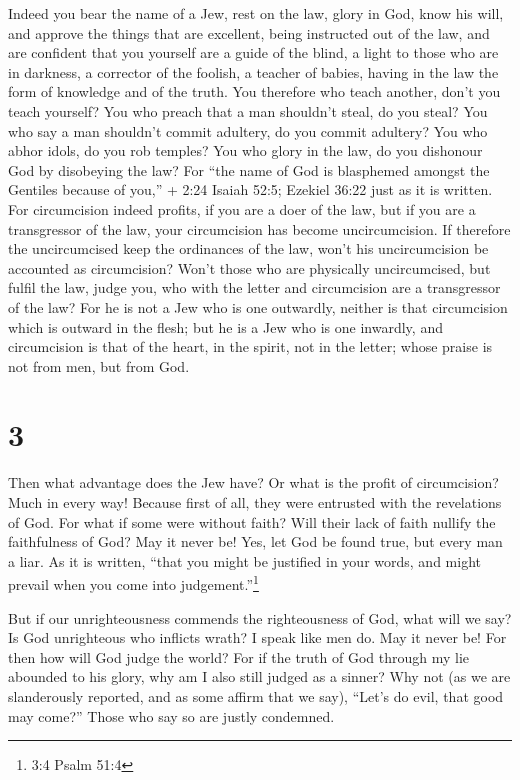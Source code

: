 Indeed you bear the name of a Jew, rest on the law, glory
in God,  know his will, and approve the things that are
excellent, being instructed out of the law,  and are
confident that you yourself are a guide of the blind, a light to those
who are in darkness,  a corrector of the foolish, a teacher
of babies, having in the law the form of knowledge and of the truth.
 You therefore who teach another, don't you teach yourself?
You who preach that a man shouldn't steal, do you steal? 
You who say a man shouldn't commit adultery, do you commit adultery? You
who abhor idols, do you rob temples?  You who glory in the
law, do you dishonour God by disobeying the law?  For ``the
name of God is blasphemed amongst the Gentiles because of you,'' + 2:24
Isaiah 52:5; Ezekiel 36:22 just as it is written.  For
circumcision indeed profits, if you are a doer of the law, but if you
are a transgressor of the law, your circumcision has become
uncircumcision.  If therefore the uncircumcised keep the
ordinances of the law, won't his uncircumcision be accounted as
circumcision?  Won't those who are physically
uncircumcised, but fulfil the law, judge you, who with the letter and
circumcision are a transgressor of the law?  For he is not
a Jew who is one outwardly, neither is that circumcision which is
outward in the flesh;  but he is a Jew who is one inwardly,
and circumcision is that of the heart, in the spirit, not in the letter;
whose praise is not from men, but from God.

\hypertarget{section-2}{%
\section{3}\label{section-2}}

 Then what advantage does the Jew have? Or what is the
profit of circumcision?  Much in every way! Because first of
all, they were entrusted with the revelations of God.  For
what if some were without faith? Will their lack of faith nullify the
faithfulness of God?  May it never be! Yes, let God be found
true, but every man a liar. As it is written, ``that you might be
justified in your words, and might prevail when you come into
judgement.''\footnote{3:4 Psalm 51:4}

 But if our unrighteousness commends the righteousness of
God, what will we say? Is God unrighteous who inflicts wrath? I speak
like men do.  May it never be! For then how will God judge
the world?  For if the truth of God through my lie abounded
to his glory, why am I also still judged as a sinner?  Why
not (as we are slanderously reported, and as some affirm that we say),
``Let's do evil, that good may come?'' Those who say so are justly
condemned.

